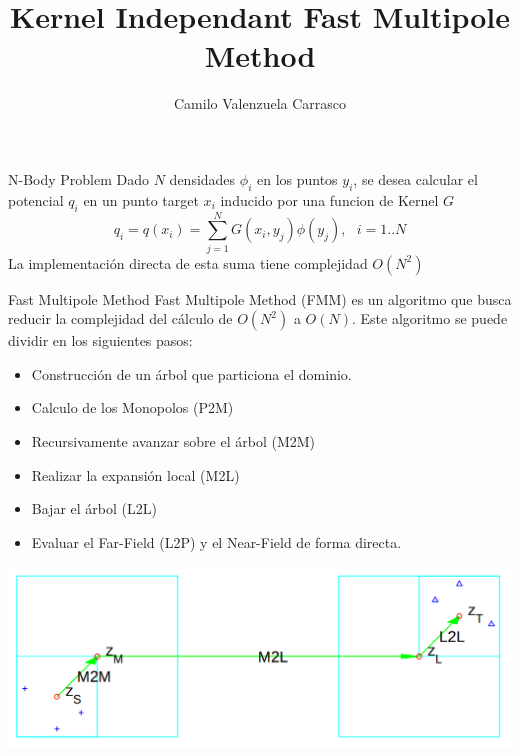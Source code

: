 \documentclass{beamer}
\title{Kernel Independant Fast Multipole Method}
\author{Camilo Valenzuela Carrasco }
\institute[Universidad Técnica Federico Santa Maria] %
{Universidad Técnica Federico Santa Maria}
\begin{document}
\begin{frame}
  \titlepage
\end{frame}



\begin{frame}{N-Body Problem}
  Dado $N$ densidades ${\phi_i}$ en los puntos ${y_i}$, se desea calcular el potencial ${q_i}$ en un punto target ${x_i}$ inducido por una funcion de Kernel $G$
  \begin{equation}
      q_i = q(x_i)= \sum_{j=1}^N  G(x_i, y_j) \phi(y_j), \ \ \ i = 1 .. N
  \end{equation}
  La implementación directa de esta suma tiene complejidad $O(N^2)$
\end{frame}
\begin{frame}{Fast Multipole Method}
  Fast Multipole Method (FMM) es un algoritmo que busca reducir la complejidad del cálculo de $O(N^2)$ a $O(N)$. Este algoritmo se puede dividir en los siguientes pasos:
  \begin{itemize}
      \item Construcción de un árbol que particiona el dominio.
      \item Calculo de los Monopolos (P2M)
      \item Recursivamente avanzar sobre el árbol (M2M)
      \item Realizar la expansión local (M2L)
      \item Bajar el árbol (L2L)
      \item Evaluar el Far-Field (L2P) y el Near-Field de forma directa.
  \end{itemize}
\end{frame}


\begin{frame}
\begin{center}
 \includegraphics[scale=0.3]{fmm.png}
\end{center}
\end{frame}
\end{document}
